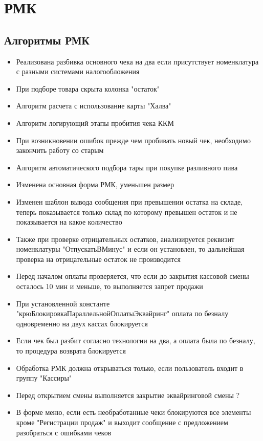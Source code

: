\section{РМК}
\subsection{Алгоритмы РМК}


\begin{itemize}
	\item Реализована разбивка основного чека на два если присутствует номенклатура с разными системами налогообложения
	\item При подборе товара скрыта колонка "остаток"
	\item Алгоритм расчета с использование карты "Халва"
	\item Алгоритм логирующий этапы пробития чека ККМ
	\item При возникновении ошибок прежде чем пробивать новый чек, необходимо закончить работу со старым
	\item Алгоритм автоматического подбора тары при покупке разливного пива
	\item Изменена основная форма РМК, уменьшен размер
	\item Изменен шаблон вывода сообщения при превышении остатка на складе, теперь показывается только склад по которому превышен остаток и не показывается на какое количество
	\item Также при проверке отрицательных остатков, анализируется реквизит номенклатуры "ОтпускатьВМинус" и если он установлен, то дальнейшая проверка на отрицательные остаток не производится
	\item Перед началом оплаты проверяется, что если до закрытия кассовой смены осталось 10 мин и меньше, то выполняется запрет продажи
 	\item При установленной константе "крюБлокировкаПараллельнойОплатыЭквайринг" оплата по безналу одновременно на двух кассах блокируется
 	\item Если чек был разбит согласно технологии на два, а оплата была по безналу, то процедура возврата блокируется
 	\item Обработка РМК должна открываться только, если пользователь входит в группу "Кассиры"
 	\item Перед открытием смены выполняется закрытие эквайринговой смены ?
 	\item В форме меню, если есть необработанные чеки блокируются все элементы кроме "Регистрации продаж" и выходит сообщение с предложением разобраться с ошибками чеков

\end{itemize}
